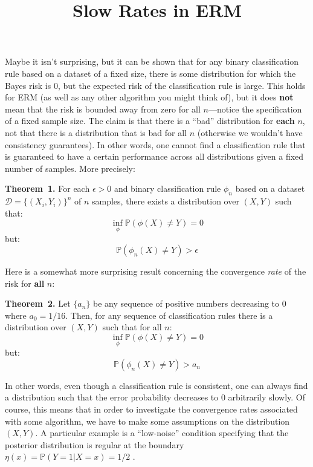 \documentclass[12pt]{article}
\title{Slow Rates in ERM}
\newenvironment{theorem}[1][]{\par\medskip
   \noindent \textbf{Theorem~#1.} \rmfamily}{\medskip}
\begin{document}
\maketitle

Maybe it isn't surprising, but it can be shown that for any
binary classification rule based on a dataset of a fixed size, there
is some distribution for which the Bayes risk is $0$, but the expected risk of
the classification rule is large. This holds for ERM (as well as any other
algorithm you might think of), but it does \textbf{not} mean that the risk is
bounded away from zero for all $n$---notice the specification of a fixed
sample size. The claim is that there is a ``bad'' distribution for
\textbf{each} $n$, not that there is a distribution that is bad
for all $n$ (otherwise we wouldn't have consistency guarantees). In
other words, one cannot find a classification rule that is guaranteed
to have a certain performance across all distributions given a fixed
number of samples. More precisely:

\begin{theorem}[1]\label{theorem:1}
  For each $\epsilon > 0$ and binary classification rule $\phi_n$ based on a dataset \(\mathcal{D} =
  \{(X_i, Y_i)\}^n\) of $n$ samples, there exists a distribution over
  $(X, Y)$ such that:
  \[\inf_\phi\mathbb{P}(\phi(X) \neq Y) = 0\]
  but:
  \[\mathbb{P}(\phi_n(X) \neq Y) > \epsilon\]

\end{theorem}

Here is a somewhat more surprising result concerning the convergence \textit{rate}
of the risk for \textbf{all} $n$:

\begin{theorem}[2]
  Let $\{a_n\}$ be any sequence of positive numbers decreasing to $0$
  where $a_0=1/16$. Then, for any sequence of classification rules
  there is a distribution over $(X, Y)$ such that for all $n$:
  \[\inf_\phi\mathbb{P}(\phi(X) \neq Y) = 0\]
  but:
  \[\mathbb{P}(\phi_n(X) \neq Y) > a_n\]
\end{theorem}

In other words, even though a classification rule is consistent, one
can always find a distribution such that the error probability
decreases to $0$ arbitrarily slowly. Of course, this means that in order
to investigate the convergence rates associated with some algorithm,
we have to make some assumptions on the distribution $(X, Y)$. A
particular example is a ``low-noise'' condition specifying that the
posterior distribution is regular at the boundary $\eta(x) =
\mathbb{P}(Y =1 | X=x) = 1/2$ \cite{bartlett-2006-risk}.
\end{document}
